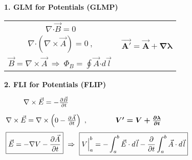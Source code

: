 \documentclass[12pt]{article}
\newcommand{\hs}{\hspace{1pt}}
\newcommand*{\dotP}{\boldsymbol \cdot}		%
\begin{document}
\vspace{10pt}
\begin{minipage}[t]{0.48\textwidth}
	\textbf{1. GLM for Potentials (GLMP)}
	\begin{center}
	\begin{tabular}{c c}
		\( \nabla \dotP \vec{B} = 0 \) & \\[10pt]
		\( \nabla \dotP ( \nabla \times \vec{A} ) = 0 \ , \) & \( \boldsymbol{ \vec{A'} = \vec{A} + \nabla \lambda } \)\\[10pt]
		\( \boxed{ \vec{B} = \nabla \times \vec{A} }
			\ \Rightarrow \ \boxed{ \Phi_B = \oint \vec{A} \dotP d\vec{\hs l} \ } \) & 
	\end{tabular}
	\end{center}
\end{minipage} 
\hspace{0\textwidth}
\begin{minipage}[t]{0.48\textwidth}
	\textbf{2. FLI for Potentials (FLIP)}

	\vspace{10pt}
	\hfill
	\(\arraycolsep=2pt \begin{array}{c c}
		\nabla \times \vec{E} = - \frac{\partial \vec{B}}{\partial t} & 	
			\\[10pt]
		\nabla \times \vec{E} = \nabla \times \left ( 0 - \frac{\partial \vec{A}}{\partial t} \right ) \ , & 
			\boldsymbol{ V' = V + \frac{\partial \lambda}{\partial t} }
			\\[10pt]
		\multicolumn{2}{c}{
			\boxed{ \vec{E} = - \nabla V - \frac{\partial \vec{A}}{\partial t} }
			\ \Rightarrow\ 
			\boxed{
				V \Big|^b_a = - \int^b_a \vec{E} \cdot d\vec{\hs l} 
				- \frac{\partial}{\partial t} \int^b_a \vec{A} \cdot d\vec{\hs l}
			}
			}
	\end{array}\)
	\hfill\hs
\end{minipage} 
\end{document}
